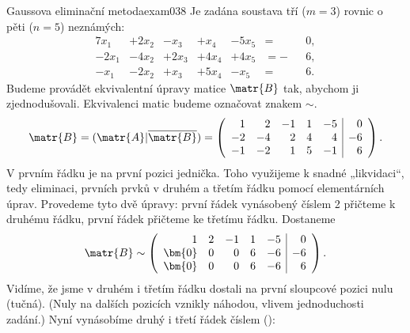 \begin{mathexam}{Gaussova eliminační metoda}{exam038}
  Je zadána soustava tří (\(m = 3\)) rovnic o pěti (\(n = 5\)) neznámých:
  \begin{alignat*}{7}
       x_1 &+ 2x_2 &-  x_3 &+  x_4 &- 5x_5 &=  &&0, \\
     -2x_1 &- 4x_2 &+ 2x_3 &+ 4x_4 &+ 4x_5 &= -&&6, \\
      -x_1 &- 2x_2 &+  x_3 &+ 5x_4 &-  x_5 &=  &&6.
  \end{alignat*}
  Budeme provádět ekvivalentní úpravy matice \(\matr{B}\) tak, abychom ji zjednodušovali.
  Ekvivalenci matic budeme označovat znakem \(\sim\). 
  \begingroup
    \renewcommand\arraystretch{1.0}
    \renewcommand\arraycolsep{3pt}
    \begin{equation*}
      \matr{B} = (\matr{A}\lvert\overline{\matr{B}}) =
      \left(
        \begin{array}{rrrrr|r}
           1 &  2 & -1 & 1 & -5 &  0    \\
          -2 & -4 &  2 & 4 &  4 & -6    \\
          -1 & -2 &  1 & 5 & -1 &  6
        \end{array}
      \right).
    \end{equation*}
  \endgroup
  V prvním řádku je na první pozici jednička. Toho využijeme k snadné „likvidaci“, tedy eliminaci,
  prvních prvků v druhém a třetím řádku pomocí elementárních úprav. Provedeme tyto dvě úpravy:
  první řádek vynásobený číslem \num{2} přičteme k druhému řádku, první řádek přičteme ke třetímu
  řádku. Dostaneme
  \begingroup
    \renewcommand\arraystretch{1.0}
    \renewcommand\arraycolsep{3pt}
    \begin{equation*}
      \matr{B} \sim
      \left(
        \begin{array}{rrrrr|r}
          1 &  2 & -1 & 1 & -5 &  0         \\
          \bm{0} &  0 &  0 & 6 & -6 & -6    \\
          \bm{0} &  0 &  0 & 6 & -6 &  6
        \end{array}
      \right).
    \end{equation*}
  \endgroup  
  Vidíme, že jsme v druhém i třetím řádku dostali na první sloupcové pozici nulu (tučná). (Nuly na
  dalších  pozicích vznikly náhodou, vlivem jednoduchosti zadání.) Nyní vynásobíme druhý i třetí
  řádek číslem ():
  \begingroup
    \renewcommand\arraystretch{1.0}
    \renewcommand\arraycolsep{3pt}    
    \begin{equation*}

\end{equation*}
\end{mathexam}
